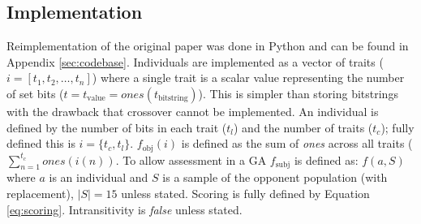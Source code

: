 \documentclass[11pt,a4paper]{article}
\begin{document}


\subsection{Implementation}
Reimplementation of the original paper was done in Python and can be found in Appendix \ref{sec:codebase}. Individuals are implemented as a vector of traits ($i=[t_1, t_2, \dots, t_n]$) where a single trait is a scalar value representing the number of set bits ($t=t_\text{value}=ones(t_\text{bitstring})$). This is simpler  than storing bitstrings with the drawback that crossover cannot be implemented. An individual is defined by the number of bits in each trait ($t_l$) and the number of traits ($t_c$); fully defined this is $i=\{t_c,t_l\}$.
$f_\text{obj}(i)$ is defined as the sum of \textit{ones} across all traits ($\sum^{t_c}_{n=1}ones(i(n))$. To allow assessment in a GA $f_\text{subj}$ is defined as: $f(a, S)$ where $a$ is an individual and $S$ is a sample of the opponent population (with replacement), $|S|=15$ unless stated. Scoring is fully defined by Equation \ref{eq:scoring}. Intransitivity is \textit{false} unless stated.
\end{document}
